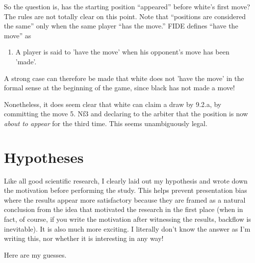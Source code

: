 \documentclass[twocolumn]{article}
\begin{document}
{  So the question is, has the starting position ``appeared'' before
  white's first move? The rules are not totally clear on this point.
  Note that ``positions are considered the same'' only when the
  same player ``has the move.'' FIDE defines ``have the move'' as
  \begin{enumerate}[label=\arabic*.3.] %
    \item A player is said to 'have the move' when his opponent's
    move has been 'made'.
  \end{enumerate}
  A strong case can therefore be made that white does not 'have the
  move' in the formal sense at the beginning of the game, since black
  has not made a move!
  
  Nonetheless, it does seem clear that white can claim a draw by
  9.2.a, by committing the move 5. Nf3 and declaring to the arbiter
  that the position is now {\it about to appear} for the third time.
  This seems unambiguously legal. }

\section{Hypotheses} \label{sec:hypotheses}

Like all good scientific research, I clearly laid out my hypothesis
and wrote down the motivation before performing the study. This helps
prevent presentation bias where the results appear more satisfactory
because they are framed as a natural conclusion from the idea that
motivated the research in the first place (when in fact, of course, if
you write the motivation after witnessing the results, backflow is
inevitable). It is also much more exciting. I literally don't know the
answer as I'm writing this, nor whether it is interesting in any way!

Here are my guesses.
\end{document}
